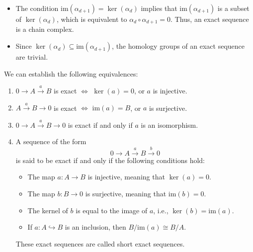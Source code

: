\begin{remark}\noindent
	\begin{itemize}
		\item The condition \( \mathrm{im}(\alpha_{d+1}) = \ker(\alpha_{d}) \) implies that \( \mathrm{im}(\alpha_{d+1}) \) is a subset of \( \ker(\alpha_{d}) \), which is equivalent to \( \alpha_{d} \circ \alpha_{d+1} = 0 \). Thus, an exact sequence is a chain complex.      		      
		\item Since \( \ker(\alpha_{d}) \subseteq \mathrm{im}(\alpha_{d+1}) \), the homology groups of an exact sequence are trivial.
	\end{itemize}
\end{remark}

\begin{proposition}
	We can establish the following equivalences:
	\begin{enumerate}
		\item $0 \xrightarrow{}A \xrightarrow{a}B$ is exact $\Longleftrightarrow$ $\ker
		      (a) = 0$, or $a$ is injective.
		      		      		      
		\item $A \xrightarrow{a}B \rightarrow 0$ is exact $\Longleftrightarrow$ $\mathrm{im}
		      (a) = B$, or $a$ is surjective.
		      		      		      
		\item $0 \xrightarrow{}A \xrightarrow{a}B \rightarrow 0$ is exact if and only
		      if $a$ is an isomorphism.
		      		      		      
		\item A sequence of the form
		      \begin{equation}
		      	0 \xrightarrow{}A \xrightarrow{a}B \xrightarrow{b}0
		      \end{equation}
		      is said to be exact if and only if the following conditions hold:
		      \begin{itemize}
		      	\item The map $a: A \rightarrow B$ is injective, meaning that
		      	      $\ker(a) = 0$.
		      	      		      	      		      	      
		      	\item The map $b: B \rightarrow 0$ is surjective, meaning that
		      	      $\mathrm{im}(b) = 0$.
		      	      		      	      		      	      
		      	\item The kernel of $b$ is equal to the image of $a$, i.e.,
		      	      $\ker(b) = \mathrm{im}(a)$.
		      	      		      	      		      	      
		      	\item If $a: A \hookrightarrow B$ is an inclusion, then $B/\mathrm{im}(a) \cong B/A$.
		      \end{itemize}
		      These exact sequences are called short exact sequences.
	\end{enumerate}
\end{proposition}

